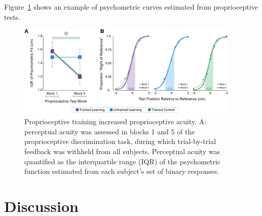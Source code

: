 \documentclass[twocolumn]{preep}
\begin{document}
\lipsum[18-19]

Figure~\ref{fig:percep} shows an example of psychometric curves
estimated from proprioceptive tests.

\begin{figure}
  \centering
  \includegraphics[width=0.95\textwidth]{percep.pdf}
  \caption{Proprioceptive training increased proprioceptive acuity. A:
    perceptual acuity was assessed in blocks 1 and 5 of the
    proprioceptive discrimination task, during which trial-by-trial
    feedback was withheld from all subjects. Perceptual acuity was
    quantified as the interquartile range (IQR) of the psychometric
    function estimated from each subject's set of binary responses.}
  \label{fig:percep}
\end{figure}

\lipsum[20-21]

\section*{Discussion}

\lipsum[22-28]




\end{document}
